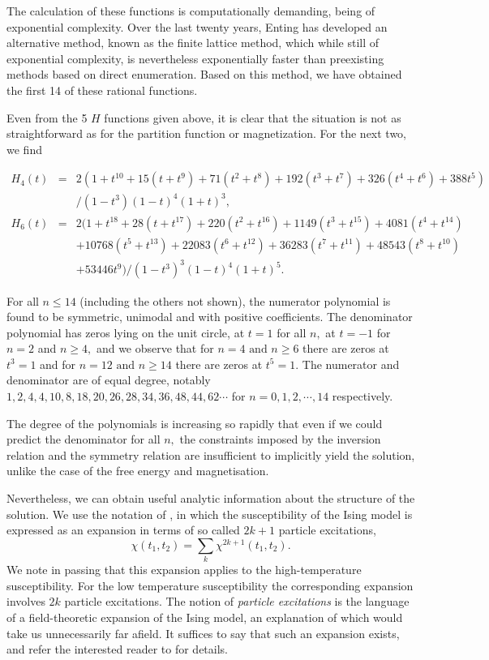 The calculation of these functions is computationally demanding,
being of exponential complexity. Over the last twenty years, Enting
\cite{Ent97} has developed an alternative method, known as the finite lattice 
method, which while still of exponential complexity, is nevertheless
exponentially faster than preexisting methods based on direct enumeration.
Based on this method, we \cite{Gut96} have obtained the first 14 of these
rational functions.

Even from the 5 $H$ functions given above, it is clear that the situation
is not as straightforward as for the partition function or magnetization.
For the next two, we \cite{Gut96} find

\begin{eqnarray*}
H_4(t) & =&  2(1 + t^{10} + 15(t+t^9) + 71(t^2+t^8) + 192(t^3+t^7) + 326(t^4+ t^6) + 388t^5)\\
       &  &   /(1 - t^3)(1 - t)^4 (1+t)^3, \\
H_6(t)& = & 2(1 + t^{18} + 28(t+t^{17}) + 220(t^2+t^{16}) + 1149(t^3+t^{15}) + 4081(t^4+ t^{14}) \\
&  & + 10768(t^5+t^{13}) +22083(t^6+t^{12})+36283(t^7+t^{11})+48543(t^8+t^{10})\\
&  & +53446t^9)/(1 - t^3)^3 (1 - t)^4 (1+t)^5.
\end{eqnarray*}


For all $n \le 14$ (including the others not shown), the numerator polynomial is
found to be
symmetric, unimodal and with positive coefficients. The denominator polynomial
has zeros lying on the unit circle, at $t = 1$ for all $n,$ at $t = -1$ for $n
=2$ and $n \ge 4,$ and we observe that for $n = 4 \mbox{  and } n \ge 6$ there
are zeros at $t^3 = 1$ and for $n = 12 \mbox{  and } n \ge 14$ there
are zeros at $t^5 = 1.$ The numerator and denominator are of equal degree,
notably $1,2,4,4,10,8,18,20,26,28,34,36,48,44,62 \cdots$ for $n =
0,1,2,\cdots,14$ respectively.

The degree of the polynomials is increasing so rapidly that even if we
could predict the denominator for all $n,$ the constraints imposed by the
inversion relation and the symmetry relation are insufficient to
implicitly yield the solution, unlike the case of the free energy and
magnetisation.

Nevertheless, we can obtain useful analytic information about the
structure of the solution. We use the notation of \cite{Wu76}, in which the
susceptibility of the Ising model is expressed as an expansion in terms
of so called $2k + 1$ particle excitations,
$$\chi(t_1,t_2) = \sum_k \chi^{2k+1}(t_1,t_2).$$
We note in passing that this expansion applies to the
high-temperature susceptibility. For
the low temperature susceptibility the corresponding expansion involves
$2k$ particle excitations. The notion of {\em particle excitations} is the
language of a field-theoretic
expansion of the Ising model, an explanation of which would take
us unnecessarily far afield. It suffices to say that such an expansion
exists, and refer the interested reader to \cite{Wu76} for details.

